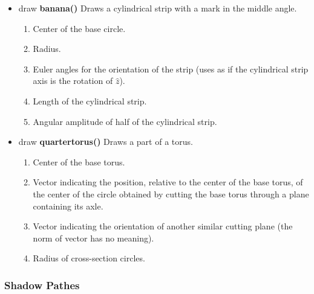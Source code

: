 \begin{itemize}
\item draw {\bfseries banana()} Draws a cylindrical strip with a mark in
  the middle angle.
  \begin{enumerate}
  \item {} Center of the base circle.
  \item {} Radius.
  \item {} Euler angles for the orientation of the strip
    (uses  as if the cylindrical strip axis is the rotation
    of $\hat{z}$).
  \item {} Length of the cylindrical strip.
  \item {} Angular amplitude of half of the cylindrical strip.
  \end{enumerate}

\item draw {\bfseries quartertorus()} Draws a part of a torus.
  \begin{enumerate}
  \item {} Center of the base torus.
  \item {} Vector indicating the position, relative to the
    center of the base torus, of the center of the circle obtained by
    cutting the base torus through a plane containing its axle. 
  \item {} Vector indicating the orientation of another
    similar cutting plane (the norm of vector has no meaning).
  \item {} Radius of cross-section circles.
  \end{enumerate}

\end{itemize}


\subsubsection{Shadow Pathes}

